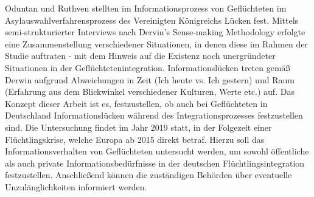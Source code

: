 \documentclass[12pt,oneside]{article}
\begin{document}
Oduntan und Ruthven stellten im Informationsprozess von Gefl\"uchteten im Asylauswahlverfahrensprozess des Vereinigten K\"onigreichs L\"ucken fest. \cite{oduntan2017investigating}
Mittels semi-strukturierter Interviews nach Dervin's Sense-making Methodology\cite{dervin2003sense} erfolgte eine Zusammenstellung verschiedener Situationen, in denen diese im Rahmen der Studie auftraten - mit dem Hinweis auf die Existenz noch unergr\"undeter Situationen in der Gefl\"uchtetenintegration.\newline
Informationsl\"ucken treten gem\"a\ss{} Derwin aufgrund Abweichungen in Zeit (Ich heute vs. Ich gestern) und Raum (Erfahrung aus dem Blickwinkel verschiedener Kulturen, Werte etc.) auf.\cite{dervin2003sense}\newline
Das Konzept dieser Arbeit ist es, festzustellen, ob auch bei Gefl\"uchteten in Deutschland Informationsl\"ucken w\"ahrend des Integrationsprozesses festzustellen sind.\newline
Die Untersuchung findet im Jahr 2019 statt, in der Folgezeit einer Fl\"uchtlingskrise, welche Europa ab 2015 direkt betraf. \cite{unhcr2015seven}\newline
Hierzu soll das Informationsverhalten von Gefl\"uchteten untersucht werden, um sowohl \"offentliche als auch private Informationsbed\"urfnisse in der deutschen Fl\"uchtlingsintegration festzustellen. Anschlie\ss{}end k\"onnen die zust\"andigen Beh\"orden \"uber eventuelle Unzul\"anglichkeiten informiert werden.

\end{document}
